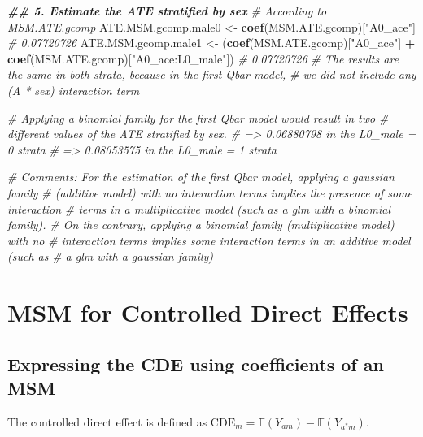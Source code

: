 \documentclass[
]{book}
\newenvironment{Shaded}{\begin{snugshade}}{\end{snugshade}}
\newcommand{\CommentTok}[1]{\textcolor[rgb]{0.56,0.35,0.01}{\textit{#1}}}
\newcommand{\DocumentationTok}[1]{\textcolor[rgb]{0.56,0.35,0.01}{\textbf{\textit{#1}}}}
\newcommand{\FunctionTok}[1]{\textcolor[rgb]{0.13,0.29,0.53}{\textbf{#1}}}
\newcommand{\NormalTok}[1]{#1}
\newcommand{\OtherTok}[1]{\textcolor[rgb]{0.56,0.35,0.01}{#1}}
\newcommand{\SpecialCharTok}[1]{\textcolor[rgb]{0.81,0.36,0.00}{\textbf{#1}}}
\newcommand{\StringTok}[1]{\textcolor[rgb]{0.31,0.60,0.02}{#1}}
\begin{document}
\begin{Shaded}
\begin{Highlighting}[]
\DocumentationTok{\#\# 5. Estimate the ATE stratified by sex}
\CommentTok{\# According to MSM.ATE.gcomp}
\NormalTok{ATE.MSM.gcomp.male0 }\OtherTok{\textless{}{-}} \FunctionTok{coef}\NormalTok{(MSM.ATE.gcomp)[}\StringTok{"A0\_ace"}\NormalTok{]}
\CommentTok{\# 0.07720726}
\NormalTok{ATE.MSM.gcomp.male1 }\OtherTok{\textless{}{-}}\NormalTok{ (}\FunctionTok{coef}\NormalTok{(MSM.ATE.gcomp)[}\StringTok{"A0\_ace"}\NormalTok{] }\SpecialCharTok{+}
                          \FunctionTok{coef}\NormalTok{(MSM.ATE.gcomp)[}\StringTok{"A0\_ace:L0\_male"}\NormalTok{])}
\CommentTok{\# 0.07720726}
\CommentTok{\# The results are the same in both strata, because in the first Qbar model,}
\CommentTok{\# we did not include any (A * sex) interaction term}

\CommentTok{\# Applying a binomial family for the first Qbar model would result in two}
\CommentTok{\# different values of the ATE stratified by sex.}
\CommentTok{\# =\textgreater{} 0.06880798 in the L0\_male = 0 strata}
\CommentTok{\# =\textgreater{} 0.08053575 in the L0\_male = 1 strata}

\CommentTok{\# Comments: For the estimation of the first Qbar model, applying a gaussian family }
\CommentTok{\# (additive model) with no interaction terms implies the presence of some interaction }
\CommentTok{\# terms in a multiplicative model (such as a glm with a binomial family).}
\CommentTok{\# On the contrary, applying a binomial family (multiplicative model) with no}
\CommentTok{\# interaction terms implies some interaction terms in an additive model (such as}
\CommentTok{\# a glm with a gaussian family)}
\end{Highlighting}
\end{Shaded}

\section{MSM for Controlled Direct Effects}\label{msm_CDE_paragraph}

\subsection{Expressing the CDE using coefficients of an MSM}\label{expressing-the-cde-using-coefficients-of-an-msm}

The controlled direct effect is defined as \(\text{CDE}_m= \mathbb{E}(Y_{am}) - \mathbb{E}(Y_{a^*m})\).
\end{document}

